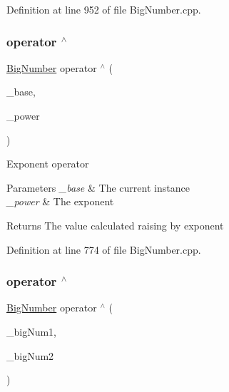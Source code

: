 Definition at line 952 of file Big\+Number.\+cpp.

\mbox{\label{class_big_nums_1_1_big_number_a0f9a8bcbc50de75e11d114a8c8629896}} 
\subsubsection{\texorpdfstring{operator $^\wedge$}{operator ^}\hspace{0.1cm}{\footnotesize\ttfamily [1/2]}}
{\footnotesize\ttfamily \mbox{\hyperlink{class_big_nums_1_1_big_number}{Big\+Number}} operator $^\wedge$ (\begin{DoxyParamCaption}\item[{\mbox{\hyperlink{class_big_nums_1_1_big_number}{Big\+Number}}}]{\+\_\+base,  }\item[{int}]{\+\_\+power }\end{DoxyParamCaption})\hspace{0.3cm}{\ttfamily [friend]}}

Exponent operator 
\begin{DoxyParams}{Parameters}
{\em \+\_\+base} & The current instance \\
\hline
{\em \+\_\+power} & The exponent \\
\hline
\end{DoxyParams}
\begin{DoxyReturn}{Returns}
The value calculated raising by exponent 
\end{DoxyReturn}


Definition at line 774 of file Big\+Number.\+cpp.

\mbox{\label{class_big_nums_1_1_big_number_a2e3512db297a67899d84f57ba0ec31f5}} 
\subsubsection{\texorpdfstring{operator $^\wedge$}{operator ^}\hspace{0.1cm}{\footnotesize\ttfamily [2/2]}}
{\footnotesize\ttfamily \mbox{\hyperlink{class_big_nums_1_1_big_number}{Big\+Number}} operator $^\wedge$ (\begin{DoxyParamCaption}\item[{const \mbox{\hyperlink{class_big_nums_1_1_big_number}{Big\+Number}} \&}]{\+\_\+big\+Num1,  }\item[{const \mbox{\hyperlink{class_big_nums_1_1_big_number}{Big\+Number}} \&}]{\+\_\+big\+Num2 }\end{DoxyParamCaption})\hspace{0.3cm}{\ttfamily [friend]}}


